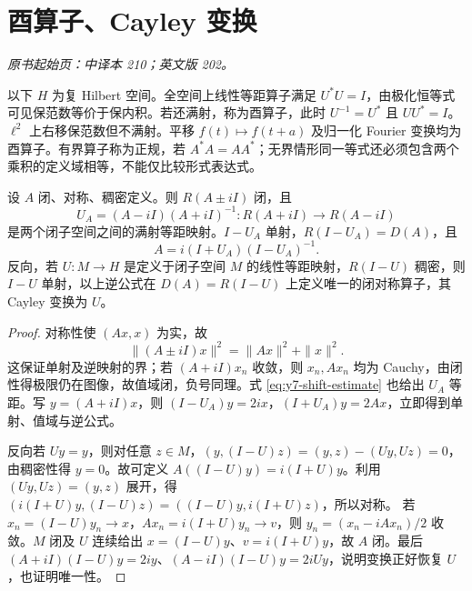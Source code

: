 \section{酉算子、Cayley 变换}\label{sec:yosida-07-04}
\noindent\textit{原书起始页：中译本 210；英文版 202。}

以下 $H$ 为复 Hilbert 空间。全空间上线性等距算子满足 $U^*U=I$，由极化恒等式可见保范数等价于保内积。若还满射，称为酉算子，此时 $U^{-1}=U^*$ 且 $UU^*=I$。$\ell^2$ 上右移保范数但不满射。平移 $f(t)\mapsto f(t+a)$ 及归一化 Fourier 变换均为酉算子。有界算子称为正规，若 $A^*A=AA^*$；无界情形同一等式还必须包含两个乘积的定义域相等，不能仅比较形式表达式。

\begin{theorem}\label{thm:y7-cayley}
设 $A$ 闭、对称、稠密定义。则 $R(A\pm iI)$ 闭，且
\[
 U_A=(A-iI)(A+iI)^{-1}:R(A+iI)\longrightarrow R(A-iI)
\]
是两个闭子空间之间的满射等距映射。$I-U_A$ 单射，$R(I-U_A)=D(A)$，且
\[
 A=i(I+U_A)(I-U_A)^{-1}.
\]
反向，若 $U:M\to H$ 是定义于闭子空间 $M$ 的线性等距映射，$R(I-U)$ 稠密，则 $I-U$ 单射，以上逆公式在 $D(A)=R(I-U)$ 上定义唯一的闭对称算子，其 Cayley 变换为 $U$。
\end{theorem}
\begin{proof}
对称性使 $(Ax,x)$ 为实，故
\begin{equation}\label{eq:y7-shift-estimate}
 \|(A\pm iI)x\|^2=\|Ax\|^2+\|x\|^2.
\end{equation}
这保证单射及逆映射的界；若 $(A+iI)x_n$ 收敛，则 $x_n,Ax_n$ 均为 Cauchy，由闭性得极限仍在图像，故值域闭，负号同理。式 \eqref{eq:y7-shift-estimate} 也给出 $U_A$ 等距。写 $y=(A+iI)x$，则 $(I-U_A)y=2ix$，$(I+U_A)y=2Ax$，立即得到单射、值域与逆公式。

反向若 $Uy=y$，则对任意 $z\in M$，$(y,(I-U)z)=(y,z)-(Uy,Uz)=0$，由稠密性得 $y=0$。故可定义
$A((I-U)y)=i(I+U)y$。利用 $(Uy,Uz)=(y,z)$ 展开，得
$(i(I+U)y,(I-U)z)=((I-U)y,i(I+U)z)$，所以对称。
若 $x_n=(I-U)y_n\to x$，$Ax_n=i(I+U)y_n\to v$，则
$y_n=(x_n-iAx_n)/2$ 收敛。$M$ 闭及 $U$ 连续给出 $x=(I-U)y$、$v=i(I+U)y$，故 $A$ 闭。最后 $(A+iI)(I-U)y=2iy$、$(A-iI)(I-U)y=2iUy$，说明变换正好恢复 $U$，也证明唯一性。
\end{proof}

